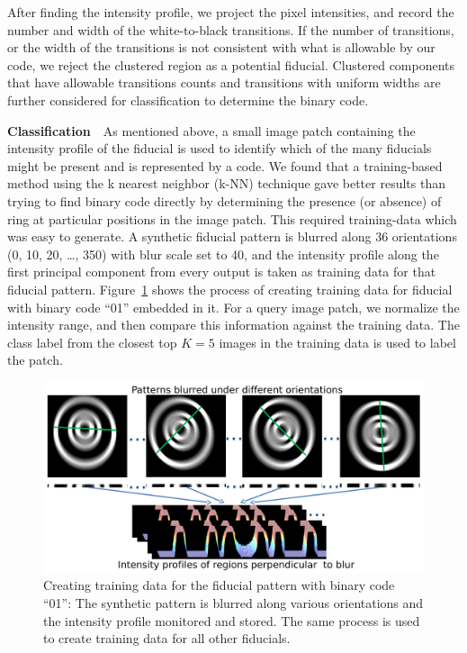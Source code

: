 \documentclass[10pt,twocolumn,letterpaper]{article}
\begin{document}
After finding the intensity profile, we project the pixel intensities,
and record the number and width of the white-to-black transitions.  If
the number of transitions, or the width of the transitions is not
consistent with what is allowable by our code, we reject the clustered
region as a potential fiducial.  Clustered components that have
allowable transitions counts and transitions with uniform widths are
further considered for classification to determine the binary code.

\textbf{Classification}~~As mentioned above, a small image patch
containing the intensity profile of the fiducial is used to identify
which of the many fiducials might be present and is represented by a
code.  We found that a training-based method using the k nearest
neighbor (k-NN) technique gave better results than trying to find
binary code directly by determining the presence (or absence) of ring
at particular positions in the image patch. This required
training-data which was easy to generate. A synthetic fiducial pattern
is blurred along 36 orientations (0, 10, 20, \ldots , 350) with blur
scale set to 40, and the intensity profile along the first principal
component from every output is taken as training data for that
fiducial pattern. Figure~\ref{fig:training_data} shows the process of
creating training data for fiducial with binary code ``01'' embedded
in it.  For a query image patch, we normalize the intensity range, and
then compare this information against the training data. The class
label from the closest top $K=5$ images in the training data is used
to label the patch.

\begin{figure}[h!]
\centering
  \includegraphics[width=0.95\linewidth]{images/training_data.pdf}
  \caption{Creating training data for the fiducial pattern with binary
  code ``01'': The synthetic pattern is blurred along various
  orientations and the intensity profile monitored and stored. The
  same process is used to create training data for all other fiducials.}
  \label{fig:training_data}
\end{figure}
\end{document}
